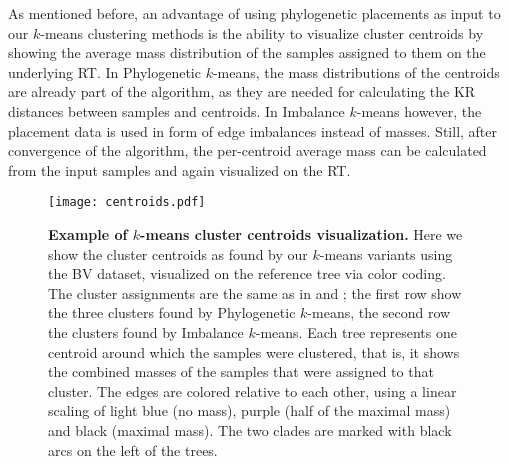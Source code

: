 As mentioned before, an advantage of using phylogenetic placements as input to our $k$-means clustering methods
is the ability to visualize cluster centroids by showing the average mass distribution
of the samples assigned to them on the underlying \acf{RT}.
In Phylogenetic $k$-means, the mass distributions of the centroids are already part of the algorithm,
as they are needed for calculating the KR distances between samples and centroids.
In Imbalance $k$-means however, the placement data is used in form of edge imbalances instead of masses.
Still, after convergence of the algorithm, the per-centroid average mass can be calculated from the input samples
and again visualized on the \ac{RT}.

\begin{figure}[!tb]
    \centering
    \texttt{[image: centroids.pdf]}
    \begin{subfigure}{0pt}
        \label{fig:centroids:sub:red}
    \end{subfigure}
    \begin{subfigure}{0pt}
        \label{fig:centroids:sub:green}
    \end{subfigure}
    \begin{subfigure}{0pt}
        \label{fig:centroids:sub:blue}
    \end{subfigure}
    \begin{subfigure}{0pt}
        \label{fig:centroids:sub:purple}
    \end{subfigure}
    \begin{subfigure}{0pt}
        \label{fig:centroids:sub:orange}
    \end{subfigure}
    \begin{subfigure}{0pt}
        \label{fig:centroids:sub:gray}
    \end{subfigure}
    \caption[Example of $k$-means cluster centroids visualization]{
        \textbf{Example of $k$-means cluster centroids visualization.}
        Here we show the cluster centroids as found by our $k$-means variants using the \ac{BV} dataset,
        visualized on the reference tree via color coding.
        The cluster assignments are the same as in  and ;
        the first row show the three clusters found by Phylogenetic $k$-means,
        the second row the clusters found by Imbalance $k$-means.
        Each tree represents one centroid around which the samples were clustered,
        that is, it shows the combined masses of the samples that were assigned to that cluster.
        The edges are colored relative to each other, using a linear scaling of
        light blue (no mass), purple (half of the maximal mass) and black (maximal mass).
        The two  clades are marked with black arcs on the left of the trees.
    }
    \label{fig:centroids}
\end{figure}

